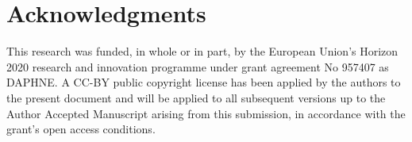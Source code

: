 \documentclass[sigconf,natbib=false]{acmart}
\newcommand{\eg}{\emph{e.g.,}}
\newcommand{\aeval}{Artifact Evaluation}
\newcommand{\todo}[1]{{\color{red}{TODO: #1}}}
\begin{document}
% 
% 
% 
% 

\section*{Acknowledgments}

This research was funded, in whole or in part, by the European Union’s Horizon 2020 research and innovation programme under grant agreement No 957407 as DAPHNE.
A CC-BY public copyright license has been applied by the authors to the present document and will be applied to all subsequent versions up to the Author Accepted Manuscript arising from this submission, in accordance with the grant’s open access conditions.


%
%
\printbibliography
\end{document}
